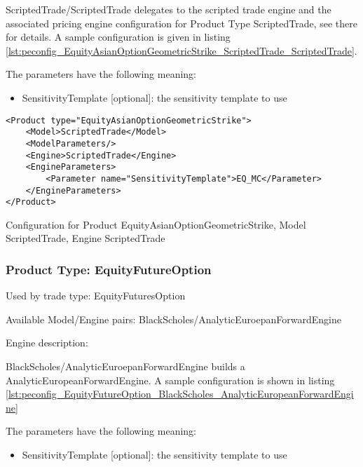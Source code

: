 ScriptedTrade/ScriptedTrade delegates to the scripted trade engine and the associated pricing engine configuration for
Product Type ScriptedTrade, see there for details. A sample configuration is given in listing
\ref{lst:peconfig_EquityAsianOptionGeometricStrike_ScriptedTrade_ScriptedTrade}.

The parameters have the following meaning:

\begin{itemize}
\item SensitivityTemplate [optional]: the sensitivity template to use 
\end{itemize}

\begin{longlisting}
\begin{verbatim}
<Product type="EquityAsianOptionGeometricStrike">
    <Model>ScriptedTrade</Model>
    <ModelParameters/>
    <Engine>ScriptedTrade</Engine>
    <EngineParameters>
        <Parameter name="SensitivityTemplate">EQ_MC</Parameter>
    </EngineParameters>
</Product>
\end{verbatim}
\caption{Configuration for Product EquityAsianOptionGeometricStrike, Model ScriptedTrade, Engine ScriptedTrade}
\label{lst:peconfig_EquityAsianOptionGeometricStrike_ScriptedTrade_ScriptedTrade}
\end{longlisting}

\subsubsection{Product Type: EquityFutureOption}

Used by trade type: EquityFuturesOption

Available Model/Engine pairs: BlackScholes/AnalyticEuroepanForwardEngine

Engine description:

BlackScholes/AnalyticEuroepanForwardEngine builds a AnalyticEuropeanForwardEngine. A sample configuration is shown in
listing \ref{lst:peconfig_EquityFutureOption_BlackScholes_AnalyticEuropeanForwardEngine}

The parameters have the following meaning:

\begin{itemize}
\item SensitivityTemplate [optional]: the sensitivity template to use 
\end{itemize}

